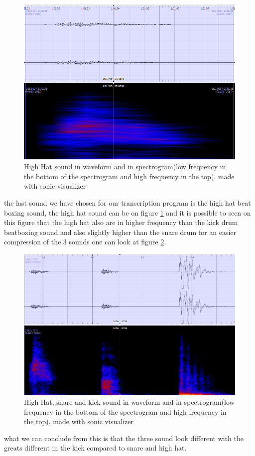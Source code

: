 \begin{figure}[h]
	\begin{center}
		\includegraphics[scale =  0.5]{fig/HH-close-up-with-spectrogram.png}
		\caption{High Hat sound in waveform and in spectrogram(low frequency in the bottom of the spectrogram and high frequency in the top), made with sonic visualizer}
		\label{HHCloseup}
	\end{center}
\end{figure}
the last sound we have chosen for our transcription program is the high hat beat boxing sound, the high hat sound can be on figure \ref{HHCloseup} and it is possible to seen on this figure that the high hat also are in higher frequency than the kick drum beatboxing sound and also slightly higher than the snare drum for an easier compression of the 3 sounds one can look at figure \ref{HH-Snare-Kick}.
\begin{figure}[h]
	\begin{center}
		\includegraphics[scale =  0.5]{fig/hh-snare-kick-with-spectogram.png}
		\caption{High Hat, snare and kick sound in waveform and in spectrogram(low frequency in the bottom of the spectrogram and high frequency in the top), made with sonic visualizer}
		\label{HH-Snare-Kick}
	\end{center}
\end{figure}
what we can conclude from this is that the three sound look different with the greats different in the kick compared to snare and high hat.
